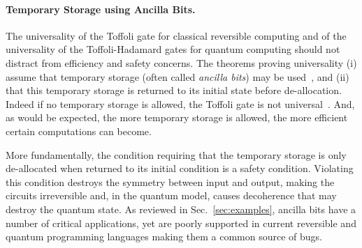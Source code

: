 \documentclass[sigplan,10pt,review,anonymous]{acmart}
\begin{document}
\paragraph*{Temporary Storage using Ancilla Bits.} The universality of
the Toffoli gate for classical reversible computing and of the
universality of the Toffoli-Hadamard gates for quantum computing should
not distract from efficiency and safety concerns. The theorems proving
universality (i) assume that temporary storage (often called
\emph{ancilla bits}) may be used~\cite{Toffoli:1980}, and (ii) that
this temporary storage is returned to its initial state before
de-allocation. Indeed if no temporary storage is allowed, the Toffoli
gate is not
universal~\cite{DBLP:conf/innovations/AaronsonGS17,DBLP:journals/corr/Xu15e}.
And, as would be expected, the more temporary storage is allowed, the
more efficient certain computations can become.

More fundamentally, the condition requiring that the temporary storage
is only de-allocated when returned to its initial condition is a
safety condition. Violating this condition destroys the symmetry
between input and output, making the circuits irreversible and, in
the quantum model, causes decoherence that may destroy the quantum
state. As reviewed in Sec.~\ref{sec:examples}, ancilla bits have a
number of critical applications, yet are poorly supported in
current reversible and quantum programming languages making them a
common source of bugs.
\end{document}
